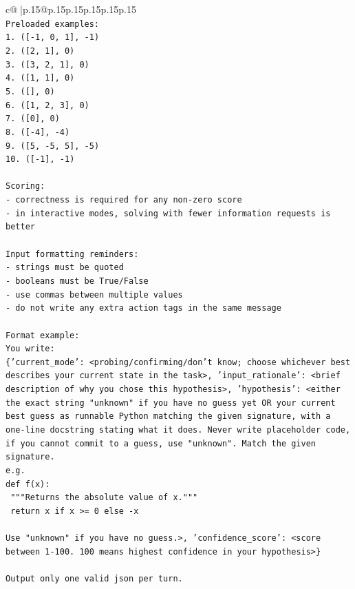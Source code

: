 \documentclass{article}
\begin{document}
{\begin{supertabular}{c@{$\;$}|p{.15\linewidth}@{}p{.15\linewidth}p{.15\linewidth}p{.15\linewidth}p{.15\linewidth}p{.15\linewidth}}
{{{\\ 
\texttt{Preloaded examples:} \\
\texttt{1. ({[}{-}1, 0, 1{]}, {-}1)} \\
\texttt{2. ({[}2, 1{]}, 0)} \\
\texttt{3. ({[}3, 2, 1{]}, 0)} \\
\texttt{4. ({[}1, 1{]}, 0)} \\
\texttt{5. ({[}{]}, 0)} \\
\texttt{6. ({[}1, 2, 3{]}, 0)} \\
\texttt{7. ({[}0{]}, 0)} \\
\texttt{8. ({[}{-}4{]}, {-}4)} \\
\texttt{9. ({[}5, {-}5, 5{]}, {-}5)} \\
\texttt{10. ({[}{-}1{]}, {-}1)} \\
\\ 
\texttt{Scoring:} \\
\texttt{{-} correctness is required for any non{-}zero score} \\
\texttt{{-} in interactive modes, solving with fewer information requests is better} \\
\\ 
\texttt{Input formatting reminders:} \\
\texttt{{-} strings must be quoted} \\
\texttt{{-} booleans must be True/False} \\
\texttt{{-} use commas between multiple values} \\
\texttt{{-} do not write any extra action tags in the same message} \\
\\ 
\texttt{Format example:} \\
\texttt{You write:} \\
\texttt{\{'current\_mode': <probing/confirming/don't know; choose whichever best describes your current state in the task>, 'input\_rationale': <brief description of why you chose this hypothesis>, 'hypothesis': <either the exact string "unknown" if you have no guess yet OR your current best guess as runnable Python matching the given signature, with a one{-}line docstring stating what it does. Never write placeholder code, if you cannot commit to a guess, use "unknown". Match the given signature.} \\
\texttt{e.g.} \\
\texttt{def f(x):} \\
\texttt{	"""Returns the absolute value of x."""} \\
\texttt{	return x if x >= 0 else {-}x} \\
\\ 
\texttt{Use "unknown" if you have no guess.>, 'confidence\_score': <score between 1{-}100. 100 means highest confidence in your hypothesis>\}} \\
\\ 
\texttt{Output only one valid json per turn.} \\
            }
        }
    }
     \\ \\


\end{supertabular}}
\end{document}
